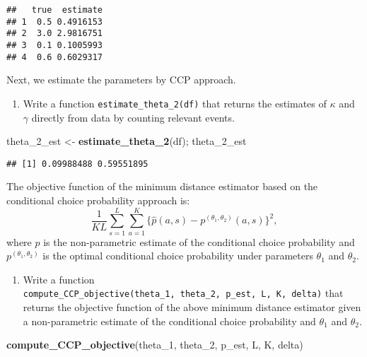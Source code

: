 \documentclass[
]{book}
\newenvironment{Shaded}{\begin{snugshade}}{\end{snugshade}}
\newcommand{\DecValTok}[1]{\textcolor[rgb]{0.00,0.00,0.81}{#1}}
\newcommand{\KeywordTok}[1]{\textcolor[rgb]{0.13,0.29,0.53}{\textbf{#1}}}
\newcommand{\NormalTok}[1]{#1}
\newcommand{\StringTok}[1]{\textcolor[rgb]{0.31,0.60,0.02}{#1}}
\providecommand{\tightlist}{%
  \setlength{\itemsep}{0pt}\setlength{\parskip}{0pt}}
\begin{document}
\begin{verbatim}
##   true  estimate
## 1  0.5 0.4916153
## 2  3.0 2.9816751
## 3  0.1 0.1005993
## 4  0.6 0.6029317
\end{verbatim}

Next, we estimate the parameters by CCP approach.

\begin{enumerate}
\def\labelenumi{\arabic{enumi}.}
\setcounter{enumi}{4}
\tightlist
\item
  Write a function \texttt{estimate\_theta\_2(df)} that returns the estimates of \(\kappa\) and \(\gamma\) directly from data by counting relevant events.
\end{enumerate}

\begin{Shaded}
\begin{Highlighting}[]
\NormalTok{theta_}\DecValTok{2}\NormalTok{_est <-}\StringTok{ }\KeywordTok{estimate_theta_2}\NormalTok{(df); theta_}\DecValTok{2}\NormalTok{_est}
\end{Highlighting}
\end{Shaded}

\begin{verbatim}
## [1] 0.09988488 0.59551895
\end{verbatim}

The objective function of the minimum distance estimator based on the conditional choice probability approach is:
\[
\frac{1}{KL}\sum_{s = 1}^L \sum_{a = 1}^K\{\hat{p}(a, s) - p^{(\theta_1, \theta_2)}(a, s)\}^2,
\]
where \(\hat{p}\) is the non-parametric estimate of the conditional choice probability and \(p^{(\theta_1, \theta_2)}\) is the optimal conditional choice probability under parameters \(\theta_1\) and \(\theta_2\).

\begin{enumerate}
\def\labelenumi{\arabic{enumi}.}
\setcounter{enumi}{5}
\tightlist
\item
  Write a function \texttt{compute\_CCP\_objective(theta\_1,\ theta\_2,\ p\_est,\ L,\ K,\ delta)} that returns the objective function of the above minimum distance estimator given a non-parametric estimate of the conditional choice probability and \(\theta_1\) and \(\theta_2\).
\end{enumerate}

\begin{Shaded}
\begin{Highlighting}[]
\KeywordTok{compute_CCP_objective}\NormalTok{(theta_}\DecValTok{1}\NormalTok{, theta_}\DecValTok{2}\NormalTok{, p_est, L, K, delta)}
\end{Highlighting}
\end{Shaded}
\end{document}
